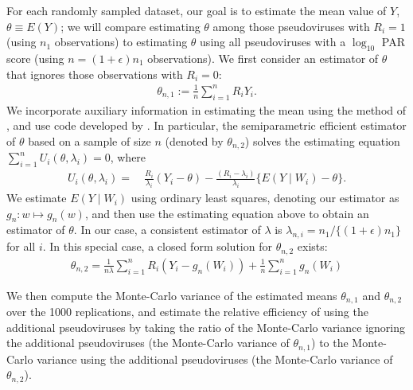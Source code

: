 \documentclass[10pt]{article}
\begin{document}
For each randomly sampled dataset, our goal is to estimate the mean value of $Y$, $\theta \equiv E(Y)$; we will compare estimating $\theta$ among those pseudoviruses with $R_i = 1$ (using $n_1$ observations) to estimating $\theta$ using all pseudoviruses with a $\log_{10}$ PAR score (using $n = (1+\epsilon)n_1$ observations). We first consider an estimator of $\theta$ that ignores those observations with $R_i = 0$:
\begin{align}\label{eq:sample_mean}
  \theta_{n,1} := \frac{1}{n}\sum_{i=1}^n R_i Y_i.
\end{align}
We incorporate auxiliary information in estimating the mean using the method of \citet{rotnitzky1995}, and use code developed by \citet{gilbert2014}. In particular, the semiparametric efficient estimator of $\theta$ based on a sample of size $n$ (denoted by $\theta_{n,2}$) solves the estimating equation $\sum_{i=1}^n U_i(\theta, \lambda_i) = 0$, where
\begin{align*}
    U_i(\theta, \lambda_i) =& \ \frac{R_i}{\lambda_i}(Y_i - \theta) - \frac{(R_i - \lambda_i)}{\lambda_i}\{E(Y \mid W_i) - \theta\}.
\end{align*}
We estimate $E(Y \mid W_i)$ using ordinary least squares, denoting our estimator as $g_n: w \mapsto g_n(w)$, and then use the estimating equation above to obtain an estimator of $\theta$. In our case, a consistent estimator of $\lambda$ is $\lambda_{n,i} = n_1 / \{(1 + \epsilon)n_1\}$ for all $i$. In this special case, a closed form solution for $\theta_{n,2}$ exists:
\begin{align}\label{eq:aug_mean}
    \theta_{n,2} = \frac{1}{n\lambda}\sum_{i=1}^nR_i(Y_i - g_n(W_i)) + \frac{1}{n}\sum_{i=1}^n g_n(W_i)
\end{align}

We then compute the Monte-Carlo variance of the estimated means $\theta_{n,1}$ and $\theta_{n,2}$ over the 1000 replications, and estimate the relative efficiency of using the additional pseudoviruses by taking the ratio of the Monte-Carlo variance ignoring the additional pseudoviruses (the Monte-Carlo variance of $\theta_{n,1}$) to the Monte-Carlo variance using the additional pseudoviruses (the Monte-Carlo variance of $\theta_{n,2}$).
\end{document}

